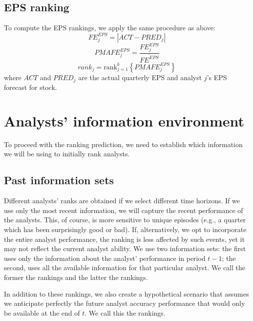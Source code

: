 \documentclass[a4paper,12pt,openright,notitlepage]{report}\usepackage[]{graphicx}\usepackage[]{color}
\begin{document}
\subsection{EPS ranking}
\label{ch4:sec-eps}
To compute the EPS rankings, we apply the same procedure as above:
\begin{equation}
	FE_{j}^{EPS}=|{ACT-PRED_{j}}|
\end{equation}
\begin{equation}
	PMAFE_{j}^{EPS}= \frac{FE_{j}^{EPS}}{\overline{FE^{EPS}}}
\end{equation}
\begin{equation}
	\label{ch4-eps:rank}
	rank_{j}=\mathrm{rank}_{j=1}^{k} \left\{ PMAFE_{j}^{EPS} \right\}
\end{equation}
where $ACT$ and $PRED_{j}$ are the actual quarterly EPS and  analyst $j$'s EPS forecast for stock.




\section{Analysts' information environment}
\label{ch4:inf-set}
To proceed with the ranking prediction, we need to establish which information we  will be using to initially rank analysts. 

\subsection{Past information sets}
Different analysts' ranks are obtained  if we select different time horizons. If we use only the most  recent information, we will capture the recent performance of the analysts. This, of course, is more sensitive to unique episodes (e.g., a quarter which has been surprisingly good or bad). If, alternatively, we opt to incorporate the entire analyst performance, the ranking is less affected by such events, yet it may not reflect the current analyst ability. We use two information sets: the first uses only the  information about the analyst' performance in period $t-1$; the second, uses all the available  information for that particular analyst. We call the former the \naive{} rankings and the latter the  rankings.

In addition to these rankings,  we also create a hypothetical scenario that assumes we anticipate perfectly the future analyst accuracy performance  that would only be available at the end of $t$.  
We call this the \tr{} rankings.
\end{document}
